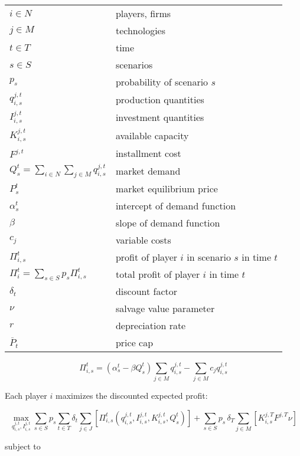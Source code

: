 \begin{longtable}[l]{l l}
$i \in N$ & players, firms \\
$j \in M$ & technologies \\
$t \in T$ & time \\
$s \in S$ & scenarios \\
$p_s$ & probability of scenario $s$\\
$ q_{i,s}^{j,t}$ & production quantities \\
$I_{i,s}^{j,t}$ & investment quantities \\
$K_{i,s}^{j,t}$ & available capacity\\
$F^{j,t}$ & installment cost\\
$Q_s^t = \sum_{i\in N}\sum_{j\in M} q_{i,s}^{j,t}$ & market demand \\
$P_s^t$ & market equilibrium price \\
$\alpha_s^t$ & intercept of demand function \\
$\beta$ & slope of demand function \\
$c_j$ & variable costs \\
$\Pi_{i,s}^t$ & profit of player $i$ in scenario $s$ in time $t$\\
$\Pi_i^t = \sum_{s\in S}p_s\Pi_{i,s}^t$ & total profit of player $i$ in time $t$\\
$\delta_t$ & discount factor \\
$\nu$ & salvage value parameter\\
$r$ & depreciation rate\\
$\overline{P}_t$ & price cap\\ 

\end{longtable}

\begin{equation}
\Pi_{i,s}^t = \left(\alpha_s^t-\beta Q_s^t \right)\sum_{j\in M}q_{i,s}^{j,t}-\sum_{j\in M}c_jq_{i,s}^{j,t}
\end{equation}

Each player $i$ maximizes the discounted expected profit:

\begin{equation}
  \label{eq:objfct}
  \max_{q_{i,s}^{j,t}, I_{i,s}^{j,t}} \sum_{s\in S}p_s \sum_{t\in T}\delta_t \sum_{j\in J}\left[\Pi_{i,s}^t\left(q_{i,s}^{j,t}, I_{i,s}^{j,t}, K_{i,s}^{j,t}, Q_s^t\right) \right ]+ \sum_{s\in S}p_s\,\delta_T \sum_{j\in M}\left[K_{i,s}^{j,T}F^{j,T}\nu\right]
\end{equation}

subject to
  
